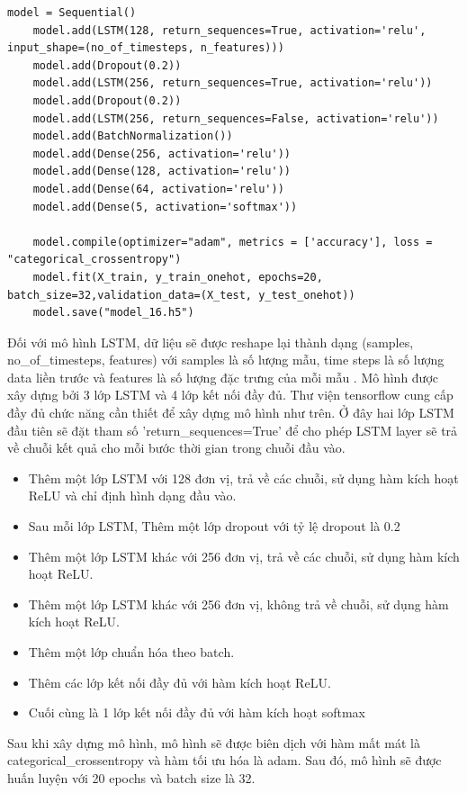 \begin{lstlisting}[style=codePython]
    model = Sequential()
    model.add(LSTM(128, return_sequences=True, activation='relu', input_shape=(no_of_timesteps, n_features)))
    model.add(Dropout(0.2))
    model.add(LSTM(256, return_sequences=True, activation='relu'))
    model.add(Dropout(0.2))
    model.add(LSTM(256, return_sequences=False, activation='relu'))
    model.add(BatchNormalization())
    model.add(Dense(256, activation='relu'))
    model.add(Dense(128, activation='relu'))
    model.add(Dense(64, activation='relu'))
    model.add(Dense(5, activation='softmax'))
    
    model.compile(optimizer="adam", metrics = ['accuracy'], loss = "categorical_crossentropy")
    model.fit(X_train, y_train_onehot, epochs=20, batch_size=32,validation_data=(X_test, y_test_onehot))
    model.save("model_16.h5")
\end{lstlisting}
Đối với mô hình LSTM, dữ liệu sẽ được reshape lại thành dạng (samples, no\_of\_timesteps, features) với samples là số lượng mẫu, time steps là số lượng data liền trước và features là số lượng đặc trưng của mỗi mẫu .
Mô hình được xây dựng bởi 3 lớp LSTM và 4 lớp kết nối đầy đủ. Thư viện tensorflow cung cấp đầy đủ chức năng cần thiết để xây dựng mô hình như trên. Ở đây hai lớp LSTM đầu tiên sẽ đặt tham số 'return\_sequences=True' để cho phép LSTM layer sẽ trả về chuỗi kết quả cho mỗi bước thời gian trong chuỗi đầu vào.
\begin{itemize}
	\item Thêm một lớp LSTM với 128 đơn vị, trả về các chuỗi, sử dụng hàm kích hoạt ReLU và chỉ định hình dạng đầu vào.
	\item Sau mỗi lớp LSTM, Thêm một lớp dropout với tỷ lệ dropout là 0.2
	\item Thêm một lớp LSTM khác với 256 đơn vị, trả về các chuỗi, sử dụng hàm kích hoạt ReLU.
        \item Thêm một lớp LSTM khác với 256 đơn vị, không trả về chuỗi, sử dụng hàm kích hoạt ReLU.
	\item Thêm một lớp chuẩn hóa theo batch.
        \item Thêm các lớp kết nối đầy đủ với hàm kích hoạt ReLU.
        \item Cuối cùng là 1 lớp kết nối đầy đủ với hàm kích hoạt softmax
\end{itemize}
Sau khi xây dựng mô hình, mô hình sẽ được biên dịch với hàm mất mát là categorical\_crossentropy và hàm tối ưu hóa là adam. Sau đó, mô hình sẽ được huấn luyện với 20 epochs và batch size là 32.

